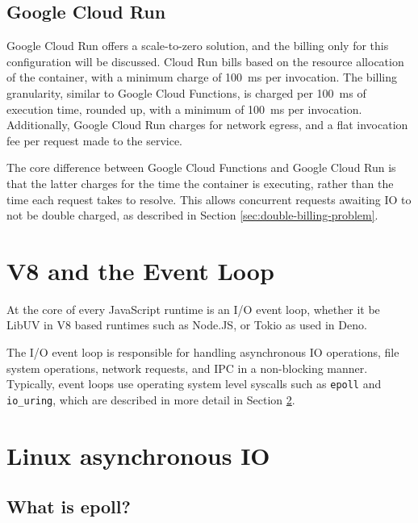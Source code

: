 \subsection{Google Cloud Run}
\label{sec:cloud-run-billing-model}
Google Cloud Run offers a scale-to-zero solution, and the billing only for this configuration will be discussed. Cloud Run bills based on the resource allocation of the container, with a minimum charge of \SI{100}{\milli\second} per invocation\cite{PricingCloudRun}. The billing granularity, similar to Google Cloud Functions, is charged per \SI{100}{\milli\second} of execution time, rounded up, with a minimum of \SI{100}{\milli\second} per invocation. Additionally, Google Cloud Run charges for network egress, and a flat invocation fee per request made to the service.

The core difference between Google Cloud Functions and Google Cloud Run is that the latter charges for the time the container is executing, rather than the time each request takes to resolve. This allows concurrent requests awaiting IO to not be double charged, as described in Section \ref{sec:double-billing-problem}.

\section{V8 and the Event Loop}
\label{sec:js-event-loop}
At the core of every JavaScript runtime is an I/O event loop, whether it be LibUV\cite{LibuvCrossplatformAsynchronous, DesignOverviewLibuv} in V8\cite{googleWhatV82024} based runtimes such as Node.JS\cite{foundationNodeJS2024}, or Tokio\cite{TokioAsynchronousRust} as used in Deno\cite{incDeno2024}.

The I/O event loop is responsible for handling asynchronous IO operations, file system operations, network requests, and IPC in a non-blocking manner. Typically, event loops use operating system level syscalls such as \verb|epoll| and \verb|io_uring|, which are described in more detail in Section \ref{sec:os-level-io}.

\section{Linux asynchronous IO}
\label{sec:os-level-io}

\subsection{What is epoll?}

